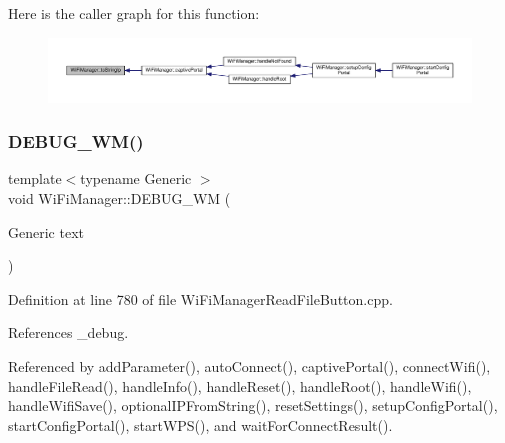 Here is the caller graph for this function\+:
\nopagebreak
\begin{figure}[H]
\begin{center}
\leavevmode
\includegraphics[width=350pt]{d4/dc8/class_wi_fi_manager_a8dfd64cefecbdf26242b16eca335c20b_icgraph}
\end{center}
\end{figure}
\mbox{\label{class_wi_fi_manager_ae5f595c670ccbcf9a191baf50f5c7c26}} 
\subsubsection{\texorpdfstring{D\+E\+B\+U\+G\+\_\+\+W\+M()}{DEBUG\_WM()}}
{\footnotesize\ttfamily template$<$typename Generic $>$ \\
void Wi\+Fi\+Manager\+::\+D\+E\+B\+U\+G\+\_\+\+WM (\begin{DoxyParamCaption}\item[{Generic}]{text }\end{DoxyParamCaption})\hspace{0.3cm}{\ttfamily [private]}}



Definition at line 780 of file Wi\+Fi\+Manager\+Read\+File\+Button.\+cpp.



References \+\_\+debug.



Referenced by add\+Parameter(), auto\+Connect(), captive\+Portal(), connect\+Wifi(), handle\+File\+Read(), handle\+Info(), handle\+Reset(), handle\+Root(), handle\+Wifi(), handle\+Wifi\+Save(), optional\+I\+P\+From\+String(), reset\+Settings(), setup\+Config\+Portal(), start\+Config\+Portal(), start\+W\+P\+S(), and wait\+For\+Connect\+Result().

